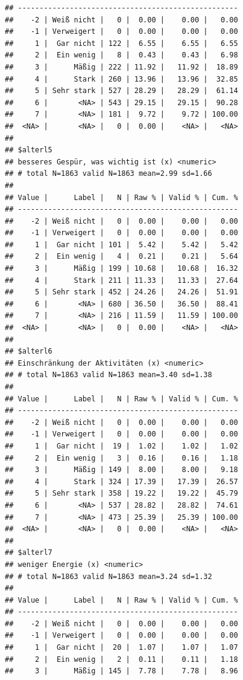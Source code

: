 \documentclass[
  doc]{apa6}
\begin{document}
\begin{verbatim}
## ---------------------------------------------------
##    -2 | Weiß nicht |   0 |  0.00 |    0.00 |   0.00
##    -1 | Verweigert |   0 |  0.00 |    0.00 |   0.00
##     1 |  Gar nicht | 122 |  6.55 |    6.55 |   6.55
##     2 |  Ein wenig |   8 |  0.43 |    0.43 |   6.98
##     3 |      Mäßig | 222 | 11.92 |   11.92 |  18.89
##     4 |      Stark | 260 | 13.96 |   13.96 |  32.85
##     5 | Sehr stark | 527 | 28.29 |   28.29 |  61.14
##     6 |       <NA> | 543 | 29.15 |   29.15 |  90.28
##     7 |       <NA> | 181 |  9.72 |    9.72 | 100.00
##  <NA> |       <NA> |   0 |  0.00 |    <NA> |   <NA>
## 
## $alterl5
## besseres Gespür, was wichtig ist (x) <numeric> 
## # total N=1863 valid N=1863 mean=2.99 sd=1.66
## 
## Value |      Label |   N | Raw % | Valid % | Cum. %
## ---------------------------------------------------
##    -2 | Weiß nicht |   0 |  0.00 |    0.00 |   0.00
##    -1 | Verweigert |   0 |  0.00 |    0.00 |   0.00
##     1 |  Gar nicht | 101 |  5.42 |    5.42 |   5.42
##     2 |  Ein wenig |   4 |  0.21 |    0.21 |   5.64
##     3 |      Mäßig | 199 | 10.68 |   10.68 |  16.32
##     4 |      Stark | 211 | 11.33 |   11.33 |  27.64
##     5 | Sehr stark | 452 | 24.26 |   24.26 |  51.91
##     6 |       <NA> | 680 | 36.50 |   36.50 |  88.41
##     7 |       <NA> | 216 | 11.59 |   11.59 | 100.00
##  <NA> |       <NA> |   0 |  0.00 |    <NA> |   <NA>
## 
## $alterl6
## Einschränkung der Aktivitäten (x) <numeric> 
## # total N=1863 valid N=1863 mean=3.40 sd=1.38
## 
## Value |      Label |   N | Raw % | Valid % | Cum. %
## ---------------------------------------------------
##    -2 | Weiß nicht |   0 |  0.00 |    0.00 |   0.00
##    -1 | Verweigert |   0 |  0.00 |    0.00 |   0.00
##     1 |  Gar nicht |  19 |  1.02 |    1.02 |   1.02
##     2 |  Ein wenig |   3 |  0.16 |    0.16 |   1.18
##     3 |      Mäßig | 149 |  8.00 |    8.00 |   9.18
##     4 |      Stark | 324 | 17.39 |   17.39 |  26.57
##     5 | Sehr stark | 358 | 19.22 |   19.22 |  45.79
##     6 |       <NA> | 537 | 28.82 |   28.82 |  74.61
##     7 |       <NA> | 473 | 25.39 |   25.39 | 100.00
##  <NA> |       <NA> |   0 |  0.00 |    <NA> |   <NA>
## 
## $alterl7
## weniger Energie (x) <numeric> 
## # total N=1863 valid N=1863 mean=3.24 sd=1.32
## 
## Value |      Label |   N | Raw % | Valid % | Cum. %
## ---------------------------------------------------
##    -2 | Weiß nicht |   0 |  0.00 |    0.00 |   0.00
##    -1 | Verweigert |   0 |  0.00 |    0.00 |   0.00
##     1 |  Gar nicht |  20 |  1.07 |    1.07 |   1.07
##     2 |  Ein wenig |   2 |  0.11 |    0.11 |   1.18
##     3 |      Mäßig | 145 |  7.78 |    7.78 |   8.96

\end{verbatim}
\end{document}
